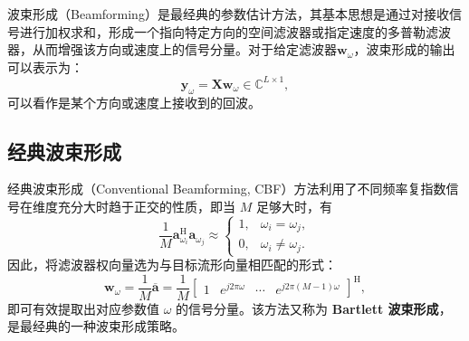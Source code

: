波束形成（Beamforming）是最经典的参数估计方法，其基本思想是通过对接收信号进行加权求和，形成一个指向特定方向的空间滤波器或指定速度的多普勒滤波器，从而增强该方向或速度上的信号分量。对于给定滤波器\( \bm{w}_{\omega} \)，波束形成的输出可以表示为：
\[
    \bm{y}_{\omega} = \mathbf{X} \bm{w}_{\omega} \in \mathbb{C}^{L \times 1},
\]
可以看作是某个方向或速度上接收到的回波。

\subsection{经典波束形成}

经典波束形成（Conventional Beamforming, CBF）方法利用了不同频率复指数信号在维度充分大时趋于正交的性质，即当 $M$ 足够大时，有
\[
    \frac{1}{M}\bm{a}_{\omega_i}^{\mathrm{H}} \bm{a}_{\omega_j} \approx
    \begin{cases}
        1, & \omega_i = \omega_j,     \\
        0, & \omega_i \neq \omega_j .
    \end{cases}
\]
因此，将滤波器权向量选为与目标流形向量相匹配的形式：
\[
    \bm{w}_{\omega} = \frac{1}{M} \overline{\bm{a}}
    = \frac{1}{M} \begin{bmatrix}
        1 & e^{j 2 \pi \omega} & \cdots & e^{j 2 \pi (M-1) \omega}
    \end{bmatrix}^{\mathrm{H}},
\]
即可有效提取出对应参数值 $\omega$ 的信号分量。该方法又称为 \textbf{Bartlett 波束形成}，是最经典的一种波束形成策略。

